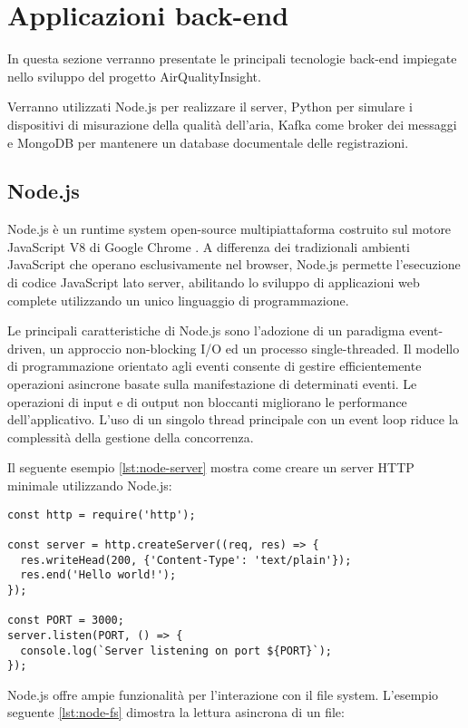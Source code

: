 \section{Applicazioni back-end}

In questa sezione verranno presentate le principali tecnologie back-end impiegate nello sviluppo del progetto AirQualityInsight.

Verranno utilizzati Node.js per realizzare il server, Python per simulare i dispositivi di misurazione della qualità dell'aria, Kafka come broker dei messaggi e MongoDB per mantenere un database documentale delle registrazioni.

\subsection{Node.js}

Node.js è un runtime system open-source multipiattaforma costruito sul motore JavaScript V8 di Google Chrome \citep{capan_2013_nodejs}. A differenza dei tradizionali ambienti JavaScript che operano esclusivamente nel browser, Node.js permette l'esecuzione di codice JavaScript lato server, abilitando lo sviluppo di applicazioni web complete utilizzando un unico linguaggio di programmazione.

Le principali caratteristiche di Node.js sono l'adozione di un paradigma event-driven, un approccio non-blocking I/O ed un processo single-threaded. Il modello di programmazione orientato agli eventi consente di gestire efficientemente operazioni asincrone basate sulla manifestazione di determinati eventi. Le operazioni di input e di output non bloccanti migliorano le performance dell'applicativo. L'uso di un singolo thread principale con un event loop riduce la complessità della gestione della concorrenza.

Il seguente esempio \ref{lst:node-server} mostra come creare un server HTTP minimale utilizzando Node.js:

\begin{lstlisting}[caption={Server HTTP base in Node.js}, label=lst:node-server]
const http = require('http');

const server = http.createServer((req, res) => {
  res.writeHead(200, {'Content-Type': 'text/plain'});
  res.end('Hello world!');
});

const PORT = 3000;
server.listen(PORT, () => {
  console.log(`Server listening on port ${PORT}`);
});
\end{lstlisting}

Node.js offre ampie funzionalità per l'interazione con il file system. L'esempio seguente \ref{lst:node-fs} dimostra la lettura asincrona di un file:


